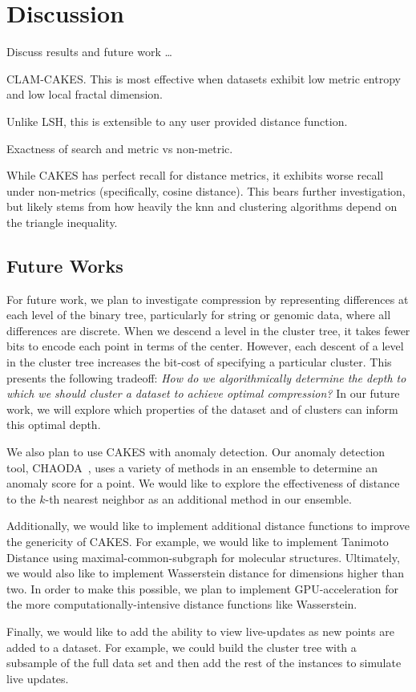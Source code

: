 \section{Discussion}
\label{sec:discussion}

Discuss results and future work \dots

CLAM-CAKES.
This is most effective when datasets exhibit low metric entropy and low local fractal dimension.

Unlike LSH, this is extensible to any user provided distance function.

Exactness of search and metric vs non-metric.

While CAKES has perfect recall for distance metrics, it exhibits worse recall under non-metrics (specifically, cosine distance). This bears further investigation, but likely stems from how heavily the knn and clustering algorithms depend on the triangle inequality.

\subsection{Future Works}
\label{subsec:results:future-works}

For future work, we plan to investigate compression by representing differences at each level of the
binary tree, particularly for string or genomic data, where all differences are discrete.
When we descend a level in the cluster tree, it takes fewer bits to encode each point in terms of the center. 
However, each descent of a level in the cluster tree increases the bit-cost of specifying a particular cluster. 
This presents the following tradeoff: \emph{How do we algorithmically determine the depth to which we should cluster a dataset to achieve optimal compression?} 
In our future work, we will explore which properties of the dataset and of clusters can inform this optimal depth. 


We also plan to use CAKES with anomaly detection. Our anomaly detection tool, CHAODA~\cite{ishaq2021clustered}, uses 
a variety of methods in an ensemble to determine an anomaly score for a point. We would like to explore the effectiveness of 
distance to the $k$-th nearest neighbor as an additional method in our ensemble.


Additionally, we would like to implement additional distance functions to improve the genericity of CAKES. 
For example, we would like to implement Tanimoto Distance using maximal-common-subgraph for molecular structures. Ultimately, 
we would also like to implement Wasserstein distance for dimensions higher than two. In order to make this possible, 
we plan to implement GPU-acceleration for the more computationally-intensive distance functions like Wasserstein.

Finally, we would like to add the ability to view live-updates as new points are added to a dataset. For example, 
we could build the cluster tree with a subsample of the full data set and then add the rest of the instances to 
simulate live updates.

